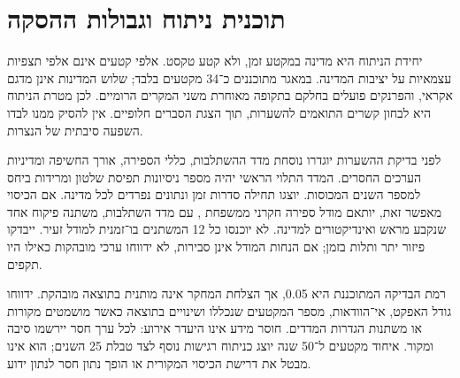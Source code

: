\section{תוכנית ניתוח וגבולות ההסקה}
\label{sec:alt-statistics}

יחידת הניתוח היא מדינה במקטע זמן, ולא קטע טקסט. אלפי קטעים אינם אלפי תצפיות עצמאיות על יציבות המדינה. במאגר מתוכננים כ־34 מקטעים בלבד; שלוש המדינות אינן מדגם אקראי, והפרנקים פועלים בחלקם בתקופה מאוחרת משני המקרים הרומיים. לכן מטרת הניתוח היא לבחון קשרים התואמים להשערות, תוך הצגת הסברים חלופיים. אין להסיק ממנו לבדו השפעה סיבתית של הנצרות.

לפני בדיקת ההשערות יוגדרו נוסחת מדד ההשתלבות, כללי הספירה, אורך החשיפה ומדיניות הערכים החסרים. המדד התלוי הראשי יהיה מספר ניסיונות תפיסת שלטון ומרידות ביחס למספר השנים המכוסות. יוצגו תחילה סדרות זמן ונתונים נפרדים לכל מדינה. אם הכיסוי מאפשר זאת, יותאם מודל ספירה חקרני ממשפחת , עם מדד השתלבות, משתנה פיקוח אחד שנקבע מראש ואינדיקטורים למדינה. לא יוכנסו כל 12 המשתנים בו־זמנית למודל זעיר. ייבדקו פיזור יתר ותלות בזמן; אם הנחות המודל אינן סבירות, לא ידווחו ערכי מובהקות כאילו היו תקפים.

רמת הבדיקה המתוכננת היא 0.05, אך הצלחת המחקר אינה מותנית בתוצאה מובהקת. ידווחו גודל האפקט, אי־הוודאות, מספר המקטעים שנכללו ושינויים בתוצאה כאשר מושמטים מקורות או משתנות הגדרות המדדים. חוסר מידע אינו היעדר אירוע: לכל ערך חסר יירשמו סיבה ומקור. איחוד מקטעים ל־50 שנה יוצג כניתוח רגישות נוסף לצד טבלת 25 השנים; הוא אינו מבטל את דרישת הכיסוי המקורית או הופך נתון חסר לנתון ידוע.
